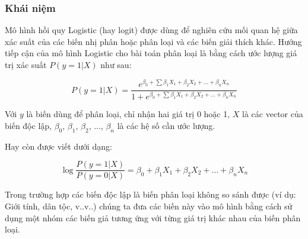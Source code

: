 \subsubsection{Khái niệm}

Mô hình hồi quy Logistic (hay logit) được dùng để nghiên cứu mối quan hệ giữa xác suất của các biến nhị phân hoặc phân loại và các biến giải thích khác. Hướng tiếp cận của mô hình Logistic cho bài toán phân loại là bằng cách ước lượng giá trị xác suất $P(y = 1|X)$ như sau:

{\large
$$
P(y = 1|X) = \frac{e^{\beta_0 + \sum\beta_1X_1 +\beta_2X_2 + \ldots + \beta_nX_n}}{1 + e^{\beta_0 + \sum\beta_1X_1 +\beta_2X_2 + \ldots + \beta_nX_n}}
$$
}

Với $y$ là biến dùng để phân loại, chỉ nhận hai giá trị 0 hoặc 1, $X$ là các vector của biến độc lập, $\beta_0$, $\beta_1$, $\beta_2$, ..., $\beta_n$ là các hệ số cần ước lượng. 

Hay còn được viết dưới dạng:

{\large
$$
\log\frac{P(y = 1|X)}{P(y = 0|X)} = \beta_0 + \beta_1X_1 +\beta_2X_2 + \ldots + \beta_nX_n
$$
}

 
Trong trường hợp các biến độc lập là biến phân loại không so sánh được (ví dụ: Giới tính, dân tộc, v..v..) chúng ta đưa các biến này vào mô hình bằng cách sử dụng một nhóm các biến giả tương ứng với từng giá trị khác nhau của biến phân loại.

